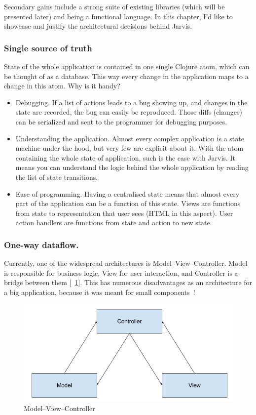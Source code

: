 \documentclass[11pt]{scrartcl}
\newcommand*{\figref}[1]{[\textbf{\figurename}~\ref{#1}]}
\begin{document}
Secondary gains include a strong suite of existing libraries (which will be
presented later) and being a functional language.
In this chapter, I’d like to showcase and justify the architectural decisions
behind Jarvis.

\subsubsection{Single source of truth}
State of the whole application is contained in one single Clojure atom, which
can be thought of as a database.
This way every change in the application maps to a change in this atom.
Why is it handy?
\begin{itemize}
\item Debugging. If a list of actions leads to a bug showing up, and changes in
  the state are recorded, the bug can easily be reproduced. Those diffs
  (changes) can be serialized and sent to the programmer for debugging purposes.
\item Understanding the application. Almost every complex application is a state
  machine under the hood, but very few are explicit about it. With the atom
  containing the whole state of application, such is the case with Jarvis. It
  means you can understand the logic behind the whole application by reading the
  list of state transitions.
\item Ease of programming. Having a centralised state
  means that almost every part of the application can be a function of this
  state. Views are functions from state to representation that user sees (HTML
  in this aspect). User action handlers are functions from state and action to
  new state.
\end{itemize}

\subsubsection{One-way dataflow.}
Currently, one of the widespread architectures is Model--View--Controller.
Model is responsible for business logic, View for user interaction, and
Controller is a bridge between them \figref{fig:mvc}.
This has numerous disadvantages as an architecture for a big application,
because it was meant for small components~\cite{Krasner:1988:CUM:50757.50759}!

\begin{figure}[hbt]
  \centering
  \includegraphics[scale=0.3]{img/MVC}
  \caption{Model--View--Controller}
\label{fig:mvc}
\end{figure}
\end{document}
